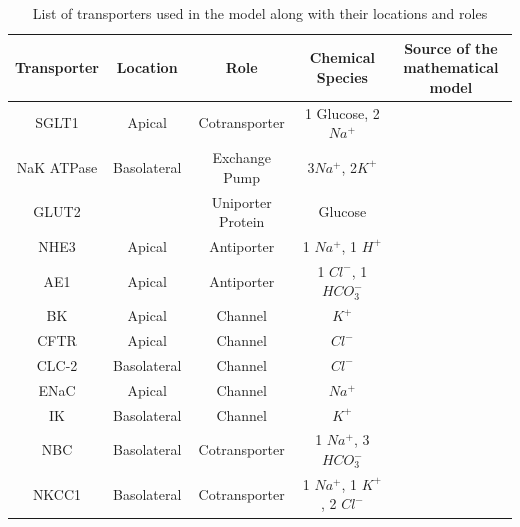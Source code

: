 \documentclass[fleqn,10pt]{physiome}
\begin{document}
\begin{table}[ht!]
    \centering
	\begin{adjustbox}{width=1\textwidth}
		\begin{tabular}{|c|c|c|c|c|}
			\hline
			Transporter& Location & Role & Chemical Species & \makecell{Source of the\\mathematical model} \\
			\hline
			SGLT1& Apical & Cotransporter &  1 Glucose, 2 $Na^{+}$ & \cite{parent1992electrogenic}\\
			\hline
			NaK ATPase& Basolateral & 
			Exchange Pump & 3$Na^{+}$, 2$K^{+}$ & \cite{thorsen2014transepithelial}\\
			\hline
			GLUT2&\makecell{Apical and Basolateral} & Uniporter Protein  &  Glucose & \cite{pradhan2013carrier}\\
			\hline
			NHE3& Apical& Antiporter & 1 $Na^{+}$, 1 $H^{+}$ & \cite{weinstein1995kinetically}\\
			\hline
			AE1&Apical & Antiporter & 1 $Cl^{-}$, 1 $HCO_{3}^{-}$ & \cite{weinstein2000mathematical}\\
			\hline
			BK& Apical& Channel & $K^{+}$ & \cite{fong2016computational}\\
			\hline
			CFTR&Apical &  Channel &  $Cl^{-}$ & \cite{fong2016computational} \\
			\hline    
			CLC-2&Basolateral &  Channel &  $Cl^{-}$ & \cite{fong2016computational} \\
			\hline     
			ENaC&Apical & Channel & $Na^{+}$ &  \cite{fong2016computational} \\
			\hline
			IK & Basolateral & Channel & $K^{+}$ & \cite{fong2016computational} \\
			\hline
			NBC& Basolateral & Cotransporter  & 1 $Na^{+}$, 3 $HCO_{3}^{-}$ & \cite{ostby2009astrocytic} \\ 
			\hline
			NKCC1& Basolateral & Cotransporter & 1 $Na^{+}$, 1 $K^{+}$, 2 $Cl^{-}$ &  \cite{palk2010dynamic}\\
			\hline  
		\end{tabular}
			
	\end{adjustbox}
		\onecolumn
		\caption{\label{Table 1} List of transporters used in the model along with their locations and roles}
\end{table}\newpage
\end{document}
